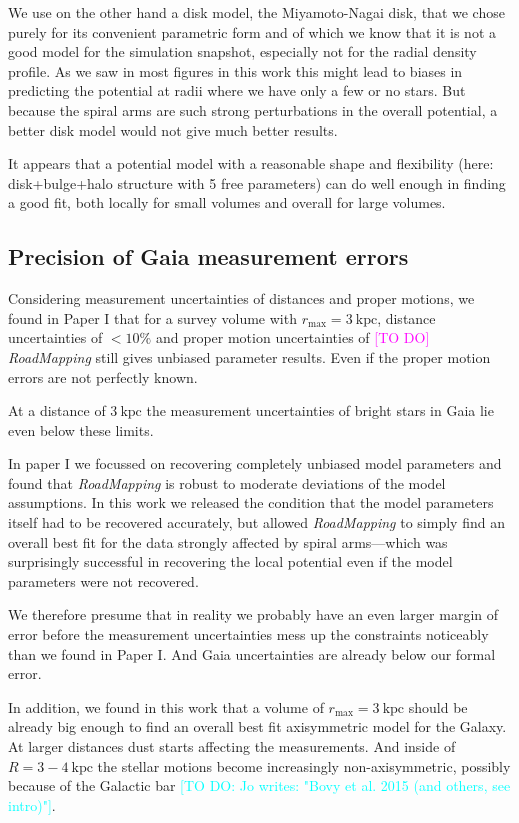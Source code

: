 \documentclass[iop,revtex4,numberedappendix,appendixfloats]{emulateapj}
\newcommand{\RM}{{\sl RoadMapping}}
\newcommand{\Wilma}[1]{\textcolor{Magenta}{#1}}
\newcommand{\Jo}[1]{\textcolor{Cyan}{#1}}
\begin{document}
We use on the other hand a disk model, the Miyamoto-Nagai disk, that we chose purely for its convenient parametric form and of which we know that it is not a good model for the simulation snapshot, especially not for the radial density profile. As we saw in most figures in this work this might lead to biases in predicting the potential at radii where we have only a few or no stars. But because the spiral arms are such strong perturbations in the overall potential, a better disk model would not give much better results.

It appears that a potential model with a reasonable shape and flexibility (here: disk+bulge+halo structure with 5 free parameters) can do well enough in finding a good fit, both locally for small volumes and overall for large volumes.

\subsection{Precision of Gaia measurement errors}

Considering measurement uncertainties of distances and proper motions, we found in Paper I that for a survey volume with $r_\text{max} = 3~\text{kpc}$, distance uncertainties of $<10\%$ and proper motion uncertainties of \Wilma{[TO DO]} \RM{} still gives unbiased parameter results. Even if the proper motion errors are not perfectly known. 

At a distance of $3~\text{kpc}$ the measurement uncertainties of bright stars in Gaia lie even below these limits. 

In paper I we focussed on recovering completely unbiased model parameters and found that \RM{} is robust to moderate deviations of the model assumptions. In this work we released the condition that the model parameters itself had to be recovered accurately, but allowed \RM{} to simply find an overall best fit for the data strongly affected by spiral arms---which was surprisingly successful in recovering the local potential even if the model parameters were not recovered. 

We therefore presume that in reality we probably have an even larger margin of error before the measurement uncertainties mess up the constraints noticeably than we found in Paper I. And Gaia uncertainties are already below our formal error.

In addition, we found in this work that a volume of $r_\text{max} = 3~\text{kpc}$ should be already big enough to find an overall best fit axisymmetric model for the Galaxy. At larger distances dust starts affecting the measurements. And inside of $R=3-4~\text{kpc}$ the stellar motions become increasingly non-axisymmetric, possibly because  of the Galactic bar \citep{2014ApJ...783..130R} \Jo{[TO DO: Jo writes: "Bovy et al. 2015 (and others, see intro)"]}.
\end{document}
